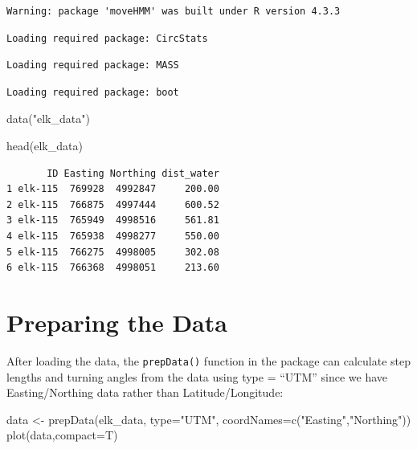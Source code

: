 \documentclass[
  letterpaper,
  DIV=11,
  numbers=noendperiod]{scrreprt}
\newenvironment{Shaded}{\begin{snugshade}}{\end{snugshade}}
\newcommand{\AttributeTok}[1]{\textcolor[rgb]{0.40,0.45,0.13}{#1}}
\newcommand{\FunctionTok}[1]{\textcolor[rgb]{0.28,0.35,0.67}{#1}}
\newcommand{\NormalTok}[1]{\textcolor[rgb]{0.00,0.23,0.31}{#1}}
\newcommand{\OtherTok}[1]{\textcolor[rgb]{0.00,0.23,0.31}{#1}}
\newcommand{\StringTok}[1]{\textcolor[rgb]{0.13,0.47,0.30}{#1}}
\begin{document}
\begin{verbatim}
Warning: package 'moveHMM' was built under R version 4.3.3
\end{verbatim}

\begin{verbatim}
Loading required package: CircStats
\end{verbatim}

\begin{verbatim}
Loading required package: MASS
\end{verbatim}

\begin{verbatim}
Loading required package: boot
\end{verbatim}

\begin{Shaded}
\begin{Highlighting}[]
\FunctionTok{data}\NormalTok{(}\StringTok{"elk\_data"}\NormalTok{)}

\FunctionTok{head}\NormalTok{(elk\_data)}
\end{Highlighting}
\end{Shaded}

\begin{verbatim}
       ID Easting Northing dist_water
1 elk-115  769928  4992847     200.00
2 elk-115  766875  4997444     600.52
3 elk-115  765949  4998516     561.81
4 elk-115  765938  4998277     550.00
5 elk-115  766275  4998005     302.08
6 elk-115  766368  4998051     213.60
\end{verbatim}

\section{Preparing the Data}\label{preparing-the-data}

After loading the data, the \texttt{prepData()} function in the package
can calculate step lengths and turning angles from the data using type =
``UTM'' since we have Easting/Northing data rather than
Latitude/Longitude:

\begin{Shaded}
\begin{Highlighting}[]
\NormalTok{data }\OtherTok{\textless{}{-}} \FunctionTok{prepData}\NormalTok{(elk\_data, }\AttributeTok{type=}\StringTok{"UTM"}\NormalTok{, }\AttributeTok{coordNames=}\FunctionTok{c}\NormalTok{(}\StringTok{"Easting"}\NormalTok{,}\StringTok{"Northing"}\NormalTok{))}
\FunctionTok{plot}\NormalTok{(data,}\AttributeTok{compact=}\NormalTok{T)}
\end{Highlighting}
\end{Shaded}
\end{document}
